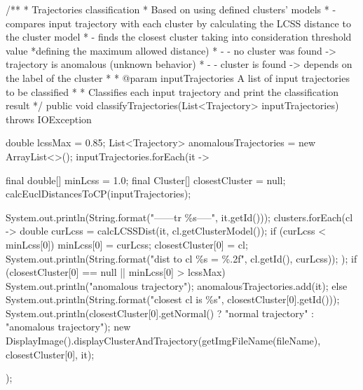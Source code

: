     /**
     * Trajectories classification
     * Based on using defined clusters' models
     * - compares input trajectory with each cluster by calculating the LCSS distance to the cluster model
     * - finds the closest cluster taking into consideration threshold value *defining the maximum allowed distance)
     * - - no cluster was found -> trajectory is anomalous (unknown behavior)
     * - - cluster is found -> depends on the label of the cluster
     *
     * @param inputTrajectories A list of input trajectories to be classified
     *
     * Classifies each input trajectory and print the classification result
     */
    public void classifyTrajectories(List<Trajectory> inputTrajectories) throws IOException {
        double lcssMax = 0.85;
        List<Trajectory> anomalousTrajectories = new ArrayList<>();
        inputTrajectories.forEach(it -> {
            final double[] minLcss = {1.0};
            final Cluster[] closestCluster = {null};
            calcEuclDistancesToCP(inputTrajectories);

            System.out.println(String.format("------tr \%s-----", it.getId()));
            clusters.forEach(cl -> {
                double curLcss = calcLCSSDist(it, cl.getClusterModel());
                if (curLcss < minLcss[0]) {
                    minLcss[0] = curLcss;
                    closestCluster[0] = cl;
                }
                System.out.println(String.format("dist to cl \%s = \%.2f", cl.getId(), curLcss));
            });
            if (closestCluster[0] == null || minLcss[0] > lcssMax) {
                System.out.println("anomalous trajectory");
                anomalousTrajectories.add(it);
            } else {
                System.out.println(String.format("closest cl is \%s", closestCluster[0].getId()));
                System.out.println(closestCluster[0].getNormal() ? "normal trajectory" : "anomalous trajectory");
                new DisplayImage().displayClusterAndTrajectory(getImgFileName(fileName), closestCluster[0], it);
            }
        });
    }
